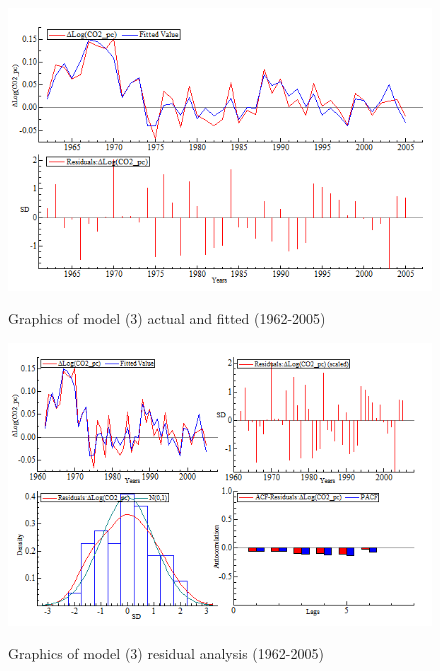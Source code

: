 \documentclass[12pt, a4paper]{article}
\begin{document}
\begin{figure}[h]
  \begin{center}
    \caption{Graphics of model (3) actual and fitted (1962-2005)}
    \includegraphics[scale=0.8]{fig3.png}
    \label{fig3} 
  \end{center}
\end{figure}

\begin{figure}[h]
  \begin{center}
    \caption{Graphics of model (3) residual analysis (1962-2005)}
    \includegraphics[scale=0.8]{fig4.png}
    \label{fig4} 
  \end{center}
\end{figure}
\end{document}
